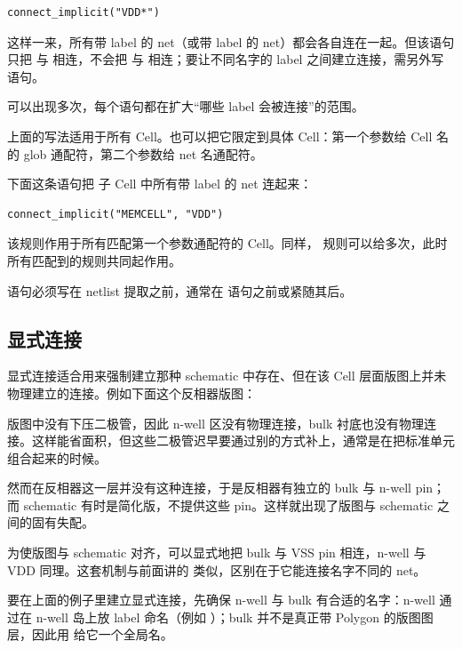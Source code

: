 \begin{lstlisting}
connect_implicit("VDD*")
\end{lstlisting}

这样一来，所有带  label 的 net（或带  label 的 net）都会各自连在一起。但该语句只把  与  相连，不会把  与  相连；要让不同名字的 label 之间建立连接，需另外写语句。

 可以出现多次，每个语句都在扩大“哪些 label 会被连接”的范围。

上面的写法适用于所有 Cell。也可以把它限定到具体 Cell：第一个参数给 Cell 名的 glob 通配符，第二个参数给 net 名通配符。

下面这条语句把  子 Cell 中所有带  label 的 net 连起来：

\begin{lstlisting}
connect_implicit("MEMCELL", "VDD")
\end{lstlisting}

该规则作用于所有匹配第一个参数通配符的 Cell。同样， 规则可以给多次，此时所有匹配到的规则共同起作用。

 语句必须写在 netlist 提取之前，通常在  语句之前或紧随其后。

\subsection{显式连接}

显式连接适合用来强制建立那种 schematic 中存在、但在该 Cell 层面版图上并未物理建立的连接。例如下面这个反相器版图：


版图中没有下压二极管，因此 n-well 区没有物理连接，bulk 衬底也没有物理连接。这样能省面积，但这些二极管迟早要通过别的方式补上，通常是在把标准单元组合起来的时候。

然而在反相器这一层并没有这种连接，于是反相器有独立的 bulk 与 n-well pin；而 schematic 有时是简化版，不提供这些 pin。这样就出现了版图与 schematic 之间的固有失配。


为使版图与 schematic 对齐，可以显式地把 bulk 与 VSS pin 相连，n-well 与 VDD 同理。这套机制与前面讲的  类似，区别在于它能连接名字不同的 net。

要在上面的例子里建立显式连接，先确保 n-well 与 bulk 有合适的名字：n-well 通过在 n-well 岛上放 label 命名（例如 ）；bulk 并不是真正带 Polygon 的版图图层，因此用  给它一个全局名。

